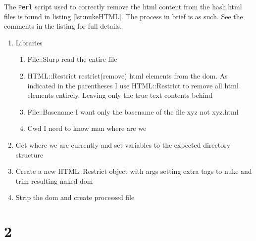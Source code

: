 \documentclass[letterpaper,10pt]{article}
\begin{document}
The \verb+Perl+ script used to correctly remove the html content from the hash.html files is found in listing \ref{lst:nukeHTML}. The process in brief is as such. See the comments in the listing for full details.
\begin{enumerate}
\item Libraries 
\begin{enumerate}
\item File::Slurp read the entire file
\item HTML::Restrict restrict(remove) html elements from the dom. As indicated in the parentheses I use HTML::Restrict to remove all html elements entirely. Leaving only the true text contents behind
\item File::Basename I want only the basename of the file xyz not xyz.html
\item Cwd I need to know man where are we
\end{enumerate}
\item Get where we are currently and set variables to the expected directory structure
\item Create a new HTML::Restrict object with args setting extra tags to nuke and trim resulting naked dom
\item Strip the dom and create processed file
\end{enumerate}

\newpage


  
\newpage    
\section*{2}
\end{document}
